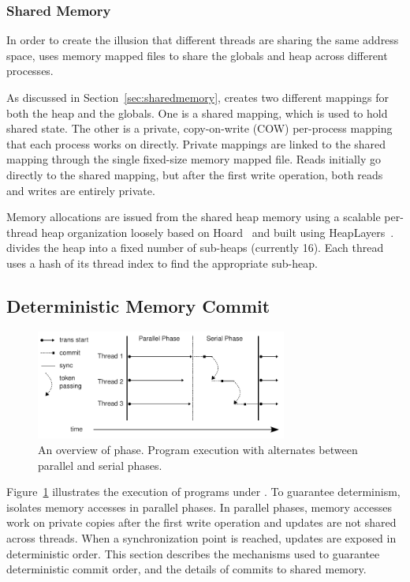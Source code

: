 \subsubsection{Shared Memory}
\label{sec:stackandheap}

In order to create the illusion that different threads are sharing the same address space, \dthreads{} uses memory mapped files to share the globals and heap across different processes.

As discussed in Section~\ref{sec:sharedmemory}, \dthreads{} creates two different mappings for both the heap and the globals.  One is a shared mapping, which is used to hold shared state. The other is a private, copy-on-write (COW) per-process mapping that each process works on directly.  Private mappings are linked to the shared mapping through the single fixed-size memory mapped file. Reads initially go directly to the shared mapping,
but after the first write operation, both reads and writes are entirely private.

Memory allocations are issued from the shared heap memory using a scalable per-thread heap organization loosely based on Hoard~\cite{BergerMcKinleyBlumofeWilson:ASPLOS2000} and built using HeapLayers~\cite{BergerZornMcKinley:2001}.  \dthreads{} divides the heap into a fixed number of sub-heaps (currently 16).  Each thread uses a hash of its thread index to find the appropriate sub-heap.

\subsection{Deterministic Memory Commit}
\label{sec:sharedmem}

\begin{figure}
{\centering 
\includegraphics[width=3.25in]{dthreads/figure/phase}
\caption{An overview of \dthreads{} phase. Program execution with \dthreads{} alternates between parallel and serial phases.\label{fig:phase}}
}
\end{figure}

Figure~\ref{fig:phase} illustrates the execution of programs under \dthreads{}.  To guarantee determinism, \dthreads{} isolates memory accesses in parallel phases. In parallel phases, memory accesses work on private copies after the first write operation and updates are not shared across threads.  When a synchronization point is reached, updates are exposed in deterministic order.  This section describes the mechanisms used to guarantee deterministic commit order, and the details of commits to shared memory.

